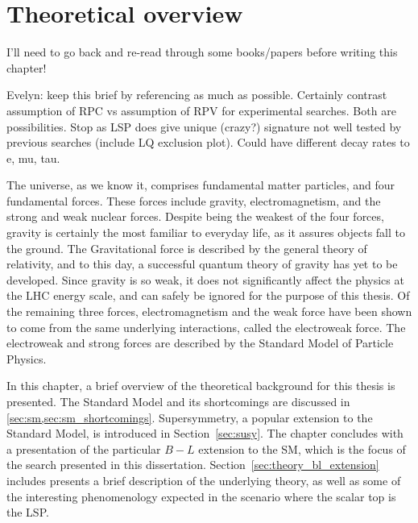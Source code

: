 \chapter[Theoretical overview][Theory]{Theoretical overview}
\label{ch:theory}

{\color{red} I'll need to go back and re-read through some books/papers before
  writing this chapter!}

{\color{red} Evelyn: 
keep this brief by referencing as much as possible.
Certainly contrast assumption of RPC vs assumption of RPV for experimental
searches.
Both are possibilities.
Stop as LSP does give unique (crazy?) signature not well
tested by previous searches (include LQ exclusion plot).
Could have different
decay rates to e, mu, tau.
}

The universe, as we know it, comprises fundamental matter particles, and
four fundamental forces.
These forces include gravity, electromagnetism, and the strong and weak nuclear
forces.
Despite being the weakest of the four forces, gravity is certainly the most
familiar to everyday life, as it assures objects fall to the ground.
The Gravitational force is described by the general theory of relativity, and
to this day, a successful quantum theory of gravity has yet to be developed.
Since gravity is so weak, it does not significantly affect the physics at the
LHC energy scale, and can safely be ignored for the purpose of this thesis.
Of the remaining three forces,  electromagnetism and the weak force have been
shown to come from the same underlying interactions, called the electroweak
force.
The electroweak and strong forces are described by the Standard Model of
Particle Physics.

In this chapter, a brief overview of the theoretical background for this thesis
is presented.
The Standard Model and its shortcomings are discussed
in \cref{sec:sm,sec:sm_shortcomings}.
Supersymmetry, a popular extension to the Standard Model, is introduced in
Section~\ref{sec:susy}.
The chapter concludes with a presentation of the particular $B-L$ extension to
the SM, which is the focus of the search presented in this dissertation.
Section~\ref{sec:theory_bl_extension} includes presents a brief description of
the underlying theory, as well as some of the interesting phenomenology expected
in the scenario where the scalar top is the LSP.

